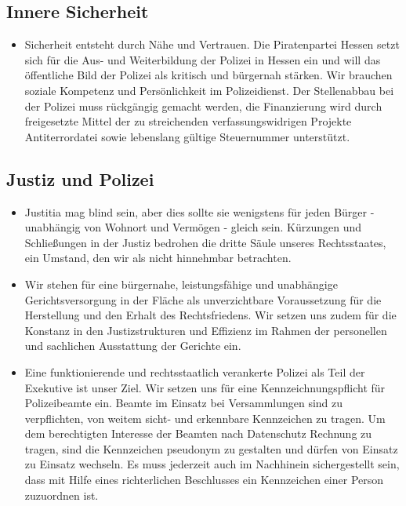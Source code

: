 \documentclass[10pt,a4paper,twocolumn,twoside,titlepage]{article}
\begin{document}
\subsection{Innere Sicherheit}
\begin{itemize}
\item Sicherheit entsteht durch Nähe und Vertrauen. Die Piratenpartei Hessen setzt sich für die Aus- und Weiterbildung der Polizei in Hessen ein und will das öffentliche Bild der Polizei als kritisch und bürgernah stärken. Wir brauchen soziale Kompetenz und Persönlichkeit im Polizeidienst. Der Stellenabbau bei der Polizei muss rückgängig gemacht werden, die Finanzierung wird durch freigesetzte Mittel der zu streichenden verfassungswidrigen Projekte Antiterrordatei sowie lebenslang gültige Steuernummer unterstützt.
\end{itemize}

\subsection{Justiz und Polizei}
\begin{itemize}
\item Justitia mag blind sein, aber dies sollte sie wenigstens für jeden Bürger - unabhängig von Wohnort und Vermögen - gleich sein. Kürzungen und Schließungen in der Justiz bedrohen die dritte Säule unseres Rechtsstaates, ein Umstand, den wir als nicht hinnehmbar betrachten.
\item Wir stehen für eine bürgernahe, leistungsfähige und unabhängige Gerichtsversorgung in der Fläche als unverzichtbare Voraussetzung für die Herstellung und den Erhalt des Rechtsfriedens. Wir setzen uns zudem für die Konstanz in den Justizstrukturen und Effizienz im Rahmen der personellen und sachlichen Ausstattung der Gerichte ein.
\item Eine funktionierende und rechtsstaatlich verankerte Polizei als Teil der Exekutive ist unser Ziel. Wir setzen uns für eine Kennzeichnungspflicht für Polizeibeamte ein. Beamte im Einsatz bei Versammlungen sind zu verpflichten, von weitem sicht- und erkennbare Kennzeichen zu tragen. Um dem berechtigten Interesse der Beamten nach Datenschutz Rechnung zu tragen, sind die Kennzeichen pseudonym zu gestalten und dürfen von Einsatz zu Einsatz wechseln. Es muss jederzeit auch im Nachhinein sichergestellt sein, dass mit Hilfe eines richterlichen Beschlusses ein Kennzeichen einer Person zuzuordnen ist.
\end{itemize}

\end{document}
